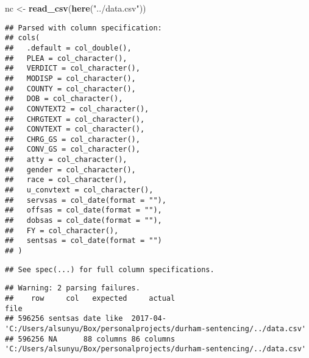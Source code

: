 \documentclass[
]{article}
\newenvironment{Shaded}{\begin{snugshade}}{\end{snugshade}}
\newcommand{\KeywordTok}[1]{\textcolor[rgb]{0.13,0.29,0.53}{\textbf{#1}}}
\newcommand{\NormalTok}[1]{#1}
\newcommand{\OperatorTok}[1]{\textcolor[rgb]{0.81,0.36,0.00}{\textbf{#1}}}
\newcommand{\StringTok}[1]{\textcolor[rgb]{0.31,0.60,0.02}{#1}}
\begin{document}
\begin{Shaded}
\begin{Highlighting}[]
\NormalTok{nc <-}\StringTok{ }\KeywordTok{read_csv}\NormalTok{(}\KeywordTok{here}\NormalTok{(}\StringTok{"../data.csv"}\NormalTok{))}
\end{Highlighting}
\end{Shaded}

\begin{verbatim}
## Parsed with column specification:
## cols(
##   .default = col_double(),
##   PLEA = col_character(),
##   VERDICT = col_character(),
##   MODISP = col_character(),
##   COUNTY = col_character(),
##   DOB = col_character(),
##   CONVTEXT2 = col_character(),
##   CHRGTEXT = col_character(),
##   CONVTEXT = col_character(),
##   CHRG_GS = col_character(),
##   CONV_GS = col_character(),
##   atty = col_character(),
##   gender = col_character(),
##   race = col_character(),
##   u_convtext = col_character(),
##   servsas = col_date(format = ""),
##   offsas = col_date(format = ""),
##   dobsas = col_date(format = ""),
##   FY = col_character(),
##   sentsas = col_date(format = "")
## )
\end{verbatim}

\begin{verbatim}
## See spec(...) for full column specifications.
\end{verbatim}

\begin{verbatim}
## Warning: 2 parsing failures.
##    row     col   expected     actual                                                                  file
## 596256 sentsas date like  2017-04-   'C:/Users/alsunyu/Box/personalprojects/durham-sentencing/../data.csv'
## 596256 NA      88 columns 86 columns 'C:/Users/alsunyu/Box/personalprojects/durham-sentencing/../data.csv'
\end{verbatim}

\begin{Shaded}
\end{Shaded}
\end{document}
